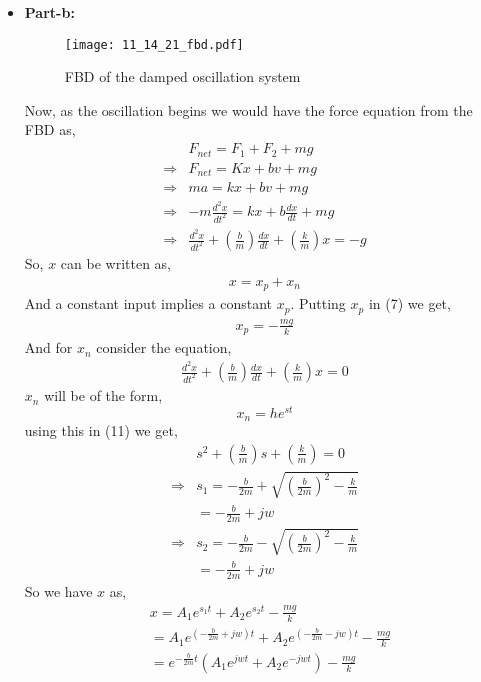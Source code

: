 \documentclass[journal,12pt,twocolumn]{IEEEtran}
\theoremstyle{remark}
\begin{document}
\begin{itemize}
\item \textbf{Part-b:}
\begin{figure}[h]
        \centering
        \texttt{[image: 11\_14\_21\_fbd.pdf]}
        \caption{FBD of the damped oscillation system}
        \label{fig:enter-label}
    \end{figure}

Now, as the oscillation begins we would have the force equation from the FBD as,
\begin{align}
    &F_{net}=F_{1}+F_{2}+mg\\
    \Rightarrow &F_{net}=Kx+bv+mg\\
    \Rightarrow &ma=kx+bv+mg\\
    \Rightarrow &-m\frac{d^2x}{dt^2}=kx+b\frac{dx}{dt}+mg\\
    \Rightarrow &\frac{d^2x}{dt^2}+\left(\frac{b}{m}\right)\frac{dx}{dt}+\left(\frac{k}{m}\right)x=-g
\end{align}
So, $x$ can be written as,
\begin{align}
x=x_{p}+x_{n}
\end{align}
And a constant input implies a constant $x_{p}$.
Putting $x_{p}$ in (7) we get,\\
\begin{align}
x_{p}=-\frac{mg}{k}
\end{align}
And for $x_{n}$ consider the equation,\\
\begin{align}
\frac{d^2x}{dt^2}+\left(\frac{b}{m}\right)\frac{dx}{dt}+\left(\frac{k}{m}\right)x=0
\end{align}
$x_{n}$ will be of the form,
\[x_{n}=he^{st}\]
using this in (11) we get,
\begin{align}
    &s^2+\left(\frac{b}{m}\right)s+\left(\frac{k}{m}\right)=0 \\
    \Rightarrow &s_{1}=-\frac{b}{2m}+\sqrt{\left(\frac{b}{2m}\right)^2-\frac{k}{m}} \\
    &=-\frac{b}{2m}+jw \\
    \Rightarrow &s_{2}=-\frac{b}{2m}-\sqrt{\left(\frac{b}{2m}\right)^2-\frac{k}{m}} \\
    &=-\frac{b}{2m}+jw
\end{align}
So we have $x$ as,
\begin{align}
    &x=A_{1}e^{s_{1}t}+A_{2}e^{s_{2}t}-\frac{mg}{k} \\
    &=A_{1}e^{\left(-\frac{b}{2m}+jw\right)t}+A_{2}e^{\left(-\frac{b}{2m}-jw\right)t}-\frac{mg}{k} \\
    &=e^{-\frac{b}{2m}t}\left(A_{1}e^{jwt}+A_{2}e^{-jwt}\right)-\frac{mg}{k} \\

\end{align}
\end{itemize}
\end{document}

